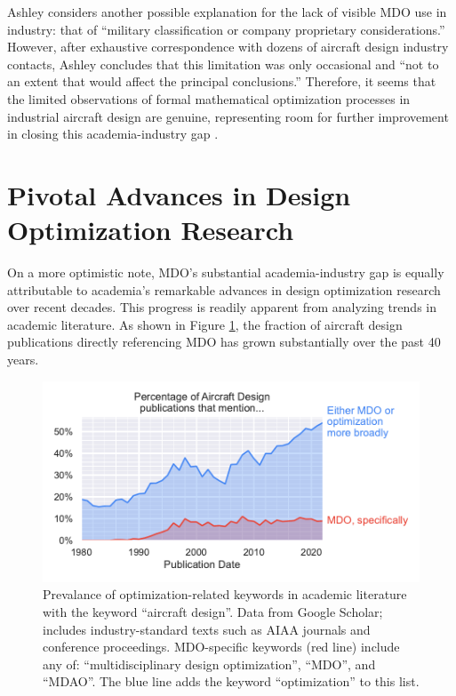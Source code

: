 Ashley considers another possible explanation for the lack of visible MDO use in industry: that of ``military classification or company proprietary considerations.'' \cite{ashley_making_1982} However, after exhaustive correspondence with dozens of aircraft design industry contacts, Ashley concludes that this limitation was only occasional and ``not to an extent that would affect the principal conclusions.'' Therefore, it seems that the limited observations of formal mathematical optimization processes in industrial aircraft design are genuine, representing room for further improvement in closing this academia-industry gap \cite{ciampa_3rd_2016, gazaix_industrialization_2017, piperni_development_2013, Shahpar_2011, vangent_knowledge_2020}.


\section{Pivotal Advances in Design Optimization Research}
\label{sec:literature_advances}

On a more optimistic note, MDO's substantial academia-industry gap is equally attributable to academia's remarkable advances in design optimization research over recent decades. This progress is readily apparent from analyzing trends in academic literature. As shown in Figure \ref{fig:mdo_citation_counts}, the fraction of aircraft design publications directly referencing MDO has grown substantially over the past 40 years.

\begin{figure}[htbp!]
    \centering
    \includegraphics{../figures/mdo_citation_counts}
    \caption{Prevalance of optimization-related keywords in academic literature with the keyword ``aircraft design''. Data from Google Scholar; includes industry-standard texts such as AIAA journals and conference proceedings. MDO-specific keywords (red line) include any of: ``multidisciplinary design optimization'', ``MDO'', and ``MDAO''. The blue line adds the keyword ``optimization'' to this list.}
    \label{fig:mdo_citation_counts}
\end{figure}

